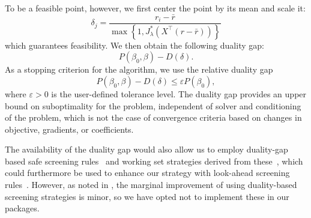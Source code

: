 \documentclass[article]{jss}
\begin{document}
\begin{appendix}
  To be a feasible point, however, we first center the point by its mean and
  scale it:
  \[
    \delta_j = \frac{r_i - \bar{r}}{\max\left\{1, J_\lambda^*\left(X^\intercal(r - \bar{r})\right) \right\}}
  \]
  which guarantees feasibility. We then obtain the following duality gap:
  \[
    P(\beta_0, \beta) - D(\delta).
  \]
  As a stopping criterion for the algorithm, we use the relative duality gap
  \[
    P(\beta_0, \beta) - D(\delta) \leq \varepsilon P(\beta_0),
  \]
  where \(\varepsilon >0\) is the user-defined tolerance level.
  The duality gap provides an upper bound on suboptimality for the problem, independent
  of solver and conditioning of the problem, which is not the case of
  convergence criteria based on changes in objective, gradients, or coefficients.

  The availability of the duality gap would also allow us to employ
  duality-gap based safe screening rules~\citep{fercoq2015} and
  working set strategies derived from these~\citep{massias2018}, which
  could furthermore be used to enhance our strategy with look-ahead
  screening rules~\citep{larsson2021a}. However,
  as noted in \citet{larsson2022d}, the marginal improvement
  of using duality-based screening strategies is minor, so we have
  opted not to implement these in our packages.

\end{appendix}
\end{document}

